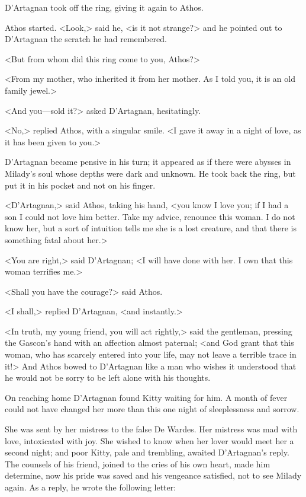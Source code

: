 D'Artagnan took off the ring, giving it again to Athos. 

Athos started. <Look,> said he, <is it not strange?> and he pointed out to D'Artagnan the scratch he had remembered. 

<But from whom did this ring come to you, Athos?> 

<From my mother, who inherited it from her mother. As I told you, it is an old family jewel.> 

<And you—sold it?> asked D'Artagnan, hesitatingly. 

<No,> replied Athos, with a singular smile. <I gave it away in a night of love, as it has been given to you.> 

D'Artagnan became pensive in his turn; it appeared as if there were abysses in Milady's soul whose depths were dark and unknown. He took back the ring, but put it in his pocket and not on his finger. 

<D'Artagnan,> said Athos, taking his hand, <you know I love you; if I had a son I could not love him better. Take my advice, renounce this woman. I do not know her, but a sort of intuition tells me she is a lost creature, and that there is something fatal about her.> 

<You are right,> said D'Artagnan; <I will have done with her. I own that this woman terrifies me.> 

<Shall you have the courage?> said Athos. 

<I shall,> replied D'Artagnan, <and instantly.> 

<In truth, my young friend, you will act rightly,> said the gentleman, pressing the Gascon's hand with an affection almost paternal; <and God grant that this woman, who has scarcely entered into your life, may not leave a terrible trace in it!> And Athos bowed to D'Artagnan like a man who wishes it understood that he would not be sorry to be left alone with his thoughts. 

On reaching home D'Artagnan found Kitty waiting for him. A month of fever could not have changed her more than this one night of sleeplessness and sorrow. 

She was sent by her mistress to the false De Wardes. Her mistress was mad with love, intoxicated with joy. She wished to know when her lover would meet her a second night; and poor Kitty, pale and trembling, awaited D'Artagnan's reply. The counsels of his friend, joined to the cries of his own heart, made him determine, now his pride was saved and his vengeance satisfied, not to see Milady again. As a reply, he wrote the following letter: 

